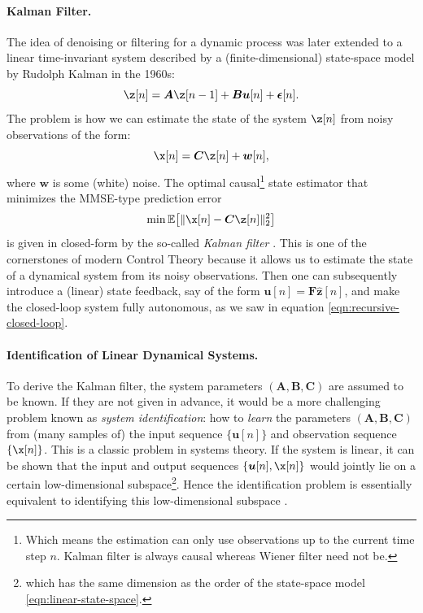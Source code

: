 \documentclass[../../book-main.tex]{subfiles}
\begin{document}
\paragraph{Kalman Filter.} 
The idea of denoising or filtering for a dynamic process was later extended to a linear time-invariant system described by a (finite-dimensional) state-space model by Rudolph Kalman in the 1960s:
\begin{equation}
    \z[n] = \boldsymbol{A} \z[n-1] + \boldsymbol{B}\boldsymbol{u}[n] + \boldsymbol{\epsilon}[n]. 
    \label{eqn:linear-state-space}
\end{equation}
The problem is how we can estimate the state of the system $\z[n]$ from noisy observations of the form: \begin{equation}\x[n] = \boldsymbol{C} \z[n] + \boldsymbol{w}[n],
\label{eqn:Kalman-model}
\end{equation}
where $\boldsymbol{w}$ is some (white) noise. The optimal causal\footnote{Which means the estimation can only use observations up to the current time step $n$. Kalman filter is always causal whereas Wiener filter need not be.} state estimator that minimizes the MMSE-type prediction error
\begin{equation}
    \min \mathbb{E}\big[ \|\x[n] - \boldsymbol{C}\z[n]\|_2^2\big]
\end{equation}
is given in closed-form by the so-called {\em Kalman filter} \cite{kalman1960new}. This is one of the cornerstones of modern Control Theory because it allows us to estimate the state of a dynamical system from its noisy observations. Then one can subsequently introduce a (linear) state feedback, say of the form $\boldsymbol{u}[n] = \boldsymbol{F} \hat{\boldsymbol{z}}[n]$, and make the closed-loop system fully autonomous, as we saw in equation \eqref{eqn:recursive-closed-loop}. 

\paragraph{Identification of Linear Dynamical Systems.}
To derive the Kalman filter, the system parameters $(\boldsymbol{A}, \boldsymbol{B}, \boldsymbol{C})$ are assumed to be known. If they are not given in advance, it would be a more challenging problem known as {\em system identification}: how to {\em learn} the parameters $(\boldsymbol{A}, \boldsymbol{B}, \boldsymbol{C})$ from (many samples of) the input sequence $\{\boldsymbol{u}[n]\}$ and observation sequence $\{\x[n]\}$. This is a classic problem in systems theory. If the system is linear, it can be shown that the input and output sequences $\{\boldsymbol{u}[n], \x[n]\}$ would jointly lie on a certain low-dimensional subspace\footnote{which has the same dimension as the order of the state-space model \eqref{eqn:linear-state-space}. }. Hence the identification problem is essentially equivalent to identifying this low-dimensional subspace \cite{OverscheeP1996,Liu-2009-CDC,Liu-2010-SIAM}. 
\end{document}
